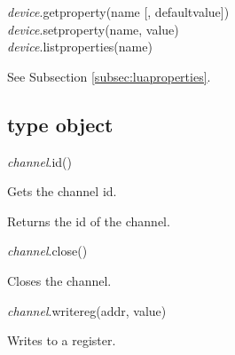 \documentclass[a4paper,12pt,twoside,extrafontsizes]{memoir}
\begin{document}

\begin{luafuncprototype}
\emph{device}.getproperty(name [, defaultvalue])\\
\emph{device}.setproperty(name, value)\\
\emph{device}.listproperties(name)
\end{luafuncprototype}

\begin{funcdescr}
	See Subsection \ref{subsec:luaproperties}.
\end{funcdescr}

\subsection{ type object}
\label{subsec:luachannel}


\begin{luafuncprototype}
\emph{channel}.id()
\end{luafuncprototype}

\begin{funcdescr}
	Gets the channel id.
\end{funcdescr}

\begin{funcret}
	Returns the id of the channel.
\end{funcret}


\begin{luafuncprototype}
\emph{channel}.close()
\end{luafuncprototype}

\begin{funcdescr}
	Closes the channel.
\end{funcdescr}


\begin{luafuncprototype}
\emph{channel}.writereg(addr, value)
\end{luafuncprototype}

\begin{funcdescr}
	Writes to a register.
\end{funcdescr}
\end{document}
